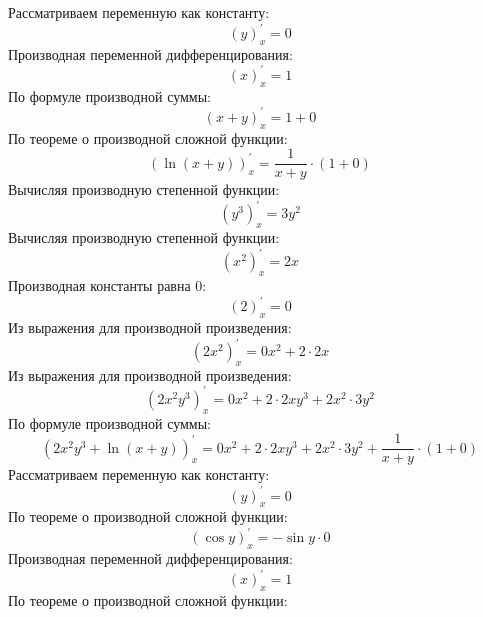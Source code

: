 \documentclass[12pt]{article}
\begin{document}
Рассматриваем переменную как константу:
\begin{dmath*}
\left(y\right)_{x}^{\prime} = 0
\end{dmath*}Производная переменной дифференцирования:
\begin{dmath*}
\left(x\right)_{x}^{\prime} = 1
\end{dmath*}По формуле производной суммы:
\begin{dmath*}
\left(x + y\right)_{x}^{\prime} = 1 + 0
\end{dmath*}По теореме о производной сложной функции:
\begin{dmath*}
\left(\ln\left(x + y\right)\right)_{x}^{\prime} =  \frac {1} {x + y}  \cdot \left(1 + 0\right)
\end{dmath*}Вычисляя производную степенной функции:
\begin{dmath*}
\left(y^{3}\right)_{x}^{\prime} = 3y^{2}
\end{dmath*}Вычисляя производную степенной функции:
\begin{dmath*}
\left(x^{2}\right)_{x}^{\prime} = 2x
\end{dmath*}Производная константы равна 0:
\begin{dmath*}
\left(2\right)_{x}^{\prime} = 0
\end{dmath*}Из выражения для производной произведения:
\begin{dmath*}
\left(2x^{2}\right)_{x}^{\prime} = 0x^{2} + 2 \cdot 2x
\end{dmath*}Из выражения для производной произведения:
\begin{dmath*}
\left(2x^{2}y^{3}\right)_{x}^{\prime} = 0x^{2} + 2 \cdot 2xy^{3} + 2x^{2} \cdot 3y^{2}
\end{dmath*}По формуле производной суммы:
\begin{dmath*}
\left(2x^{2}y^{3} + \ln\left(x + y\right)\right)_{x}^{\prime} = 0x^{2} + 2 \cdot 2xy^{3} + 2x^{2} \cdot 3y^{2} +  \frac {1} {x + y}  \cdot \left(1 + 0\right)
\end{dmath*}Рассматриваем переменную как константу:
\begin{dmath*}
\left(y\right)_{x}^{\prime} = 0
\end{dmath*}По теореме о производной сложной функции:
\begin{dmath*}
\left(\cos y\right)_{x}^{\prime} = -\sin y \cdot 0
\end{dmath*}Производная переменной дифференцирования:
\begin{dmath*}
\left(x\right)_{x}^{\prime} = 1
\end{dmath*}По теореме о производной сложной функции:
\end{document}
